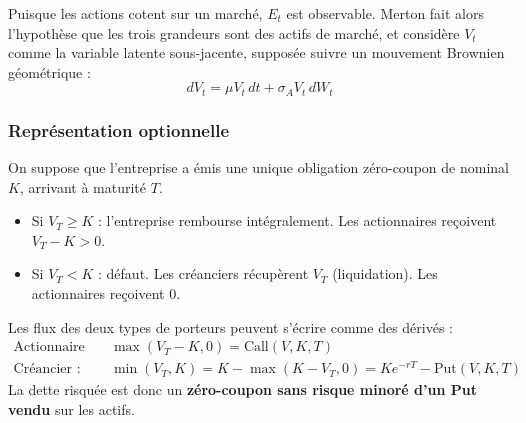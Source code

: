 Puisque les actions cotent sur un marché, $E_t$ est observable. Merton fait alors l'hypothèse que les trois grandeurs sont des actifs de marché, et considère $V_t$ comme la variable latente sous-jacente, supposée suivre un mouvement Brownien géométrique :
\[
dV_t = \mu V_t \, dt + \sigma_A V_t \, dW_t
\]

\subsubsection{Représentation optionnelle}

On suppose que l'entreprise a émis une unique obligation zéro-coupon de nominal $K$, arrivant à maturité $T$.

\begin{itemize}
    \item Si $V_T \geq K$ : l'entreprise rembourse intégralement. Les actionnaires reçoivent $V_T - K > 0$.
    \item Si $V_T < K$ : défaut. Les créanciers récupèrent $V_T$ (liquidation). Les actionnaires reçoivent $0$.
\end{itemize}

\begin{definition}
Les flux des deux types de porteurs peuvent s'écrire comme des dérivés :
\begin{align}
\text{Actionnaire :} & \quad \max(V_T - K, 0) = \text{Call}(V, K, T) \\
\text{Créancier :}   & \quad \min(V_T, K) = K - \max(K - V_T, 0) = K e^{-rT} - \text{Put}(V, K, T)
\end{align}
La dette risquée est donc un \textbf{zéro-coupon sans risque minoré d'un Put vendu} sur les actifs.
\end{definition}

